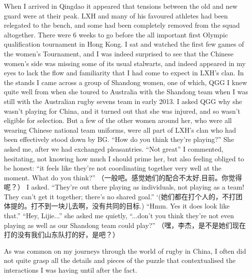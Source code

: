 When I arrived in Qingdao it appeared that tensions between the old and new guard were at their peak.  LXH and many of his favoured athletes had been relegated to the bench, and some had been completely removed from the squad altogether.  There were 6 weeks to go before the all important first Olympic qualification tournament in Hong Kong.  I sat and watched the first few games of the women's Tournament, and I was indeed surprised to see that the Chinese women's side was missing some of its usual stalwarts, and indeed appeared in my eyes to lack the flow and familiarity that I had come to expect in LXH's clan.  In the stands I came across a group of Shandong women, one of which, QGG I knew quite well from when she toured to Australia with the Shandong team when I was still with the Australian rugby sevens team in early 2013.  I asked QGG why she wasn't playing for China, and it turned out that she was injured, and so wasn't eligible for selection.  But a few of the other women around her, who were all wearing Chinese national team uniforms, were all part of LXH's clan who had been effectively stood down by BG. ``How do you think they're playing?'' She asked me, after we had exchanged pleasantries. ``Not great'' I commented, hesitating, not knowing how much I should prime her, but also feeling obliged to be honest: ``it feels like they’re not coordinating together very well at the moment.  What do you think?'' （一般吧。感觉她们的配合不太好,目前。你觉得呢？） I asked.  ``They’re out there playing as individuals, not playing as a team! They can't get it together; there's no shared goal.'' `(她们都在打个人的，不打团体提的。打不到一块儿去啊，没有共同的目标.)  ``Hmm. Yes it does look like that.'' ``Hey, Lijie...'' she asked me quietly, ``...don’t you think they’re not even playing as well as our Shandong team could play?'' （嘿，李杰，是不是她们现在打的没有我们山东队打的好，是吧？）

As was common on my journeys through the world of rugby in China, I often did not quite grasp all the details and pieces of the puzzle that contextualised the interactions I was having until after the fact.

